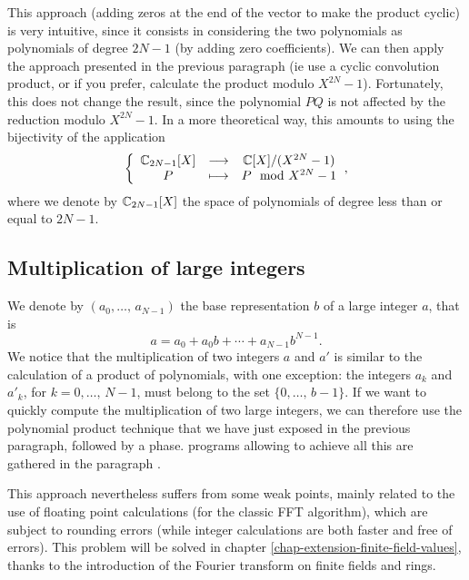 
 This approach (adding zeros at the end of the vector to make the product cyclic) is very intuitive, since it consists in considering the two polynomials as polynomials of degree $ 2N-1 $ (by adding zero coefficients). We can then apply the approach presented in the previous paragraph (ie use a cyclic convolution product, or if you prefer, calculate the product modulo $ X^{2N} -1 $). Fortunately, this does not change the result, since the polynomial $ PQ $ is not affected by the reduction modulo $ X^{2N} -1 $. In a more theoretical way, this amounts to using the bijectivity of the application
\begin{equation*}
{\left\{ \begin{array}{ccc} \mathbb{C}_{2N-1}[X] & \longrightarrow & \mathbb{C}[X] / (X^{2N} - 1) \\ P & \longmapsto & P \mod{X^{2N} - 1} \end{array} \right.},
\end{equation*}
where we denote by $ \mathbb{C}_{2N-1}[X] $ the space of polynomials of degree less than or equal to $ 2N-1 $.
\subsection{Multiplication of large integers}
\label{sect2-multiplication-integers} 
 
 
   We denote by $ (a_0, \ldots, \, a_{N-1}) $ the base representation $ b $ of a large integer $ a $, that is
\begin{equation*}
a = a_0 + a_0 b + \cdots + a_{N-1} b^{N-1}.
\end{equation*}
 We notice that the multiplication of two integers $ a $ and $ a'$ is similar to the calculation of a product of polynomials, with one exception: the integers $ a_k $ and $ a'_k $, for $ k = 0, \ldots, \, N-1 $, must belong to the set $ \{0, \ldots, \, b-1 \} $. If we want to quickly compute the multiplication of two large integers, we can therefore use the polynomial product technique that we have just exposed in the previous paragraph, followed by a  phase. \Matlab{} programs allowing to achieve all this are gathered in the paragraph .
 
 
This approach nevertheless suffers from some weak points, mainly related to the use of floating point calculations (for the classic FFT algorithm), which are subject to rounding errors (while integer calculations are both faster and free of errors). This problem will be solved in chapter \ref{chap-extension-finite-field-values}, thanks to the introduction of the Fourier transform on finite fields and rings.

